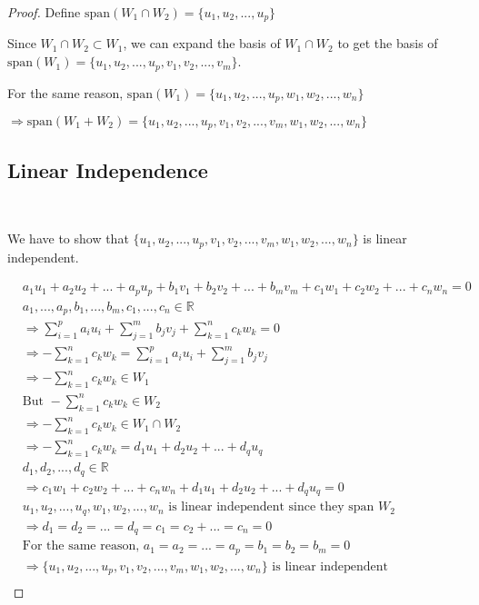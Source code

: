 \documentclass{article}
\def\R{\mathbb{R}}
\begin{document}
\begin{proof}

Define $\mathrm{span}(W_1 \cap W_2) = \{u_1,u_2,...,u_p\}$

Since $W_1\cap W_2 \subset W_1$, we can expand the basis of $W_1\cap W_2$ to get the basis of $\mathrm{span}(W_1) =\{u_1,u_2,...,u_p,v_1,v_2,...,v_m\}$.

For the same reason, $\mathrm{span}(W_1) =\{u_1,u_2,...,u_p,w_1,w_2,...,w_n\}$

$\Rightarrow \mathrm{span}(W_1+W_2)=\{u_1,u_2,...,u_p,v_1,v_2,...,v_m,w_1,w_2,...,w_n\}$

\subsection{Linear Independence}

~

We have to show that $\{u_1,u_2,...,u_p,v_1,v_2,...,v_m,w_1,w_2,...,w_n\}$ is linear independent.

\begin{equation}
\tag{2.1}
\begin{split}
&a_1 u_1+a_2 u_2+...+a_p u_p+b_1 v_1+b_2 v_2+...+ b_m v_m+c_1 w_1+c_2 w_2+...+c_n w_n=0\\
&a_1,...,a_p,b_1,...,b_m,c_1,...,c_n\in\R\\
&\Rightarrow \sum_{i=1}^{p}a_i u_i+\sum_{j=1}^{m}b_j v_j+\sum_{k=1}^{n}c_k w_k=0\\
&\Rightarrow -\sum_{k=1}^{n}c_k w_k = \sum_{i=1}^{p}a_i u_i+\sum_{j=1}^{m}b_j v_j\\
&\Rightarrow -\sum_{k=1}^{n}c_k w_k \in W_1\\
&\text{But }-\sum_{k=1}^{n}c_k w_k\in W_2\\
&\Rightarrow -\sum_{k=1}^{n}c_k w_k\in W_1\cap W_2\\
&\Rightarrow -\sum_{k=1}^{n}c_k w_k = d_1 u_1 + d_2 u_2 +...+d_q u_q\\
& d_1,d_2,...,d_q\in \R\\
&\Rightarrow c_1 w_1+c_2 w_2+...+c_n w_n+d_1 u_1 + d_2 u_2 +...+d_q u_q=0\\
&u_1,u_2,...,u_q,w_1,w_2,...,w_n \text{ is linear independent since they span } W_2\\
&\Rightarrow d_1=d_2=...=d_q=c_1=c_2+...=c_n=0\\
&\text{For the same reason, } a_1=a_2=...=a_p=b_1=b_2=b_m=0\\
&\Rightarrow \{u_1,u_2,...,u_p,v_1,v_2,...,v_m,w_1,w_2,...,w_n\} \text{ is linear independent}\\
\end{split}
\end{equation}


\end{proof}
\end{document}
